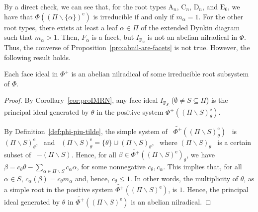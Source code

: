 \documentclass[ALCO,published]{cedram}
\theoremstyle{plain}
\newcommand\wt{\widetilde}
\newcommand\smeno{\smallsetminus}
\newcommand\al{\alpha}
\newcommand\be{\beta}
\newcommand\erm{{\mathrm{e}}}
\renewcommand{\leq}{\leqslant}
\begin{document}


By a direct check, we can see that, for the root types $\mathrm A_n$, $\mathrm C_n$, $\mathrm D_n$, and $\mathrm E_6$, we have that $\Phi((\Pi\smeno \{\al\})^\erm)$ is irreducible if and only if $m_\al=1$. 
For the other root types, there exists at least a leaf $\al\in \Pi$ of the extended Dynkin diagram such that $m_\al>1$. 
Then, $F_\al$ is a facet, but $I_{\mathrm F_\al}$ is not an abelian nilradical in $\Phi$. 
Thus, the converse of Proposition~\ref{pro:abnil-are-facets} is not true. 
However, the following result holds. 

\begin{pro}\label{pro:faces-are-abnil}
Each face ideal in $\Phi^+$ is an abelian nilradical of some irreducible root subsystem of $\Phi$. 
\end{pro}

\begin{proof}
By Corollary~\ref{cor:proIMRN}, any face ideal $I_{\mathrm F_S}$ ($\emptyset\neq S\subseteq \Pi$) is the principal ideal generated by $\theta$ in the positive system $\wt{\Phi^+}((\Pi\smeno S)^\erm_\theta)$. 

\par
By Definition~\ref{def:phi-piu-tilde}, the simple system of \ $\wt{\Phi^+}((\Pi\smeno S)^\erm_\theta)$ \ is \  $(\Pi\smeno S)^\erm_\theta$, \ and \ $(\Pi\smeno S)^\erm_\theta=\{\theta\}\cup(\Pi\smeno S)_\theta$, \  where $(\Pi\smeno S)_\theta$ \ is a certain subset of \ $-(\Pi\smeno S)$.
Hence, for all $\be\in\wt{\Phi^+}((\Pi\smeno S)^\erm)_\theta$, we have  $\be=c_\theta \theta-\sum\limits_{\al\in \Pi\smeno S} c_\al\al$, for some nonnegative $c_\theta, c_\al$. 
This implies that, for all $\al\in S$, $c_\al(\be)= c_\theta m_\al$ and, hence,  $c_\theta\leq 1$.
In other words, the  multiplicity of $\theta$, as a simple root in the positive system $\wt{\Phi^+}((\Pi\smeno S)^\erm)$, is $1$.
Hence, the principal ideal generated by $\theta$ in $\wt{\Phi^+}((\Pi\smeno S)^\erm)$ is an abelian nilradical.
\end{proof}
\end{document}
